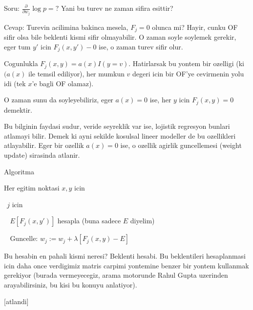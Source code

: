 \documentclass[12pt,fleqn]{article}\usepackage{../common}
\begin{document}
Soru: $\frac{\partial}{\partial w_j} \log p = ?$ Yani bu turev ne zaman sifira esittir? 

Cevap: Turevin acilimina bakinca mesela, $F_j=0$ olunca mi? Hayir, cunku OF
sifir olsa bile beklenti kismi sifir olmayabilir. O zaman soyle soylemek
gerekir, eger tum $y'$ icin $F_j(x,y') - 0$ ise, o zaman turev sifir olur. 

Cogunlukla $F_j(x,y) = a(x)I(y=v)$. Hatirlarsak bu yontem bir ozelligi (ki
$(a(x)$ ile temsil ediliyor), her mumkun $v$ degeri icin bir OF'ye
cevirmenin yolu idi (tek $x$'e bagli OF olamaz).

O zaman sunu da soyleyebiliriz, eger $a(x) = 0$ ise, her $y$ icin $F_j(x,y)
= 0$ 
demektir. 

Bu bilginin faydasi sudur, veride seyreklik var ise, lojistik regresyon
bunlari atlamayi bilir. Demek ki ayni sekilde kosulsal lineer modeller de
bu ozellikleri atlayabilir. Eger bir ozellik $a(x)=0$ ise, o ozellik
agirlik guncellemesi (weight update) sirasinda atlanir. 

Algoritma

Her egitim noktasi $x,y$ icin

$ \ \ $$j$ icin
    
$ \ \ \ \ $$E[F_j(x,y')]$ hesapla (buna sadece $E$ diyelim)
       
$ \ \ \ \ $Guncelle: $w_j := w_j + \lambda[F_j(x,y) - E]$


Bu hesabin en pahali kismi neresi? Beklenti hesabi. Bu beklentileri
hesaplanmasi icin daha once verdigimiz matris carpimi yontemine benzer bir
yontem kullanmak gerekiyor (burada vermeyecegiz, arama motorunde Rahul
Gupta uzerinden arayabilirsiniz, bu kisi bu konuyu anlatiyor).

[atlandi]
\end{document}
